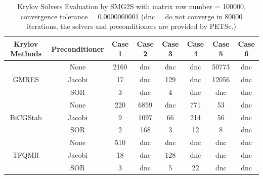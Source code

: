 \begin{table}[t]
	\caption{Krylov Solvers Evaluation by SMG2S with matrix row number = \num[round-precision=2,round-mode=figures]{100000}, convergence tolerance = \num[round-precision=2,round-mode=figures]{0.0000000001} (dnc = do not converge in  \num[round-precision=2,round-mode=figures]{80000} iterations, the solvers and preconditioners are provided by PETSc.)}
	\label{krylov}
	\centering
	\footnotesize
	\renewcommand{\arraystretch}{1.5}
	\begin{tabular}{c|c|c|c|c|c|c|c}
		\toprule
		\cellcolor{gray!50}\textbf{Krylov Methods} & 	\cellcolor{gray!50}\textbf{Preconditioner} & 	\cellcolor{gray!50}\textbf{Case 1} & 	\cellcolor{gray!50}\textbf{Case 2} 
		& 	\cellcolor{gray!50}\textbf{Case 3} & 	\cellcolor{gray!50}\textbf{Case 4} & 	\cellcolor{gray!50}\textbf{Case 5} & 	\cellcolor{gray!50}\textbf{Case 6} \\ 
		\midrule
		\multirow{3}{*}{GMRES} & None & 2160 & dnc
		& dnc & dnc &50773 & dnc\\ 
		\cline{2-8}
		& 	\cellcolor{gray!20}Jacobi& 	\cellcolor{gray!20}17 & 	\cellcolor{gray!20}dnc & 	\cellcolor{gray!20}129 & 	\cellcolor{gray!20}dnc &	\cellcolor{gray!20}12056 & 	\cellcolor{gray!20}dnc\\
		\cline{2-8}
		& SOR& 3 &dnc & 4 &dnc & dnc & dnc\\
		\hline
		\multirow{3}{*}{BiCGStab} & 	\cellcolor{gray!20}None & \cellcolor{gray!20}220 & \cellcolor{gray!20}6859
		& \cellcolor{gray!20}dnc&\cellcolor{gray!20}771 &\cellcolor{gray!20}53 &\cellcolor{gray!20}dnc\\ 
		\cline{2-8}
		& Jacobi& 9& 1097 & 66 &214 & 56 &dnc\\
		\cline{2-8}
		& \cellcolor{gray!20}SOR&\cellcolor{gray!20}2 &\cellcolor{gray!20}168 & \cellcolor{gray!20}3 & \cellcolor{gray!20}12 & \cellcolor{gray!20}8& \cellcolor{gray!20}dnc\\
		\hline
		\multirow{3}{*}{TFQMR} & None & 510 & dnc
		& dnc &dnc &dnc& dnc\\ 
		\cline{2-8}
		& \cellcolor{gray!20}Jacobi& \cellcolor{gray!20}18 & \cellcolor{gray!20}dnc & \cellcolor{gray!20}128 & \cellcolor{gray!20}dnc & \cellcolor{gray!20}dnc& \cellcolor{gray!20}dnc\\
		\cline{2-8}
		& SOR& 3&dnc &  5&22 &dnc& dnc\\
		\bottomrule
		
	\end{tabular}
\end{table}

